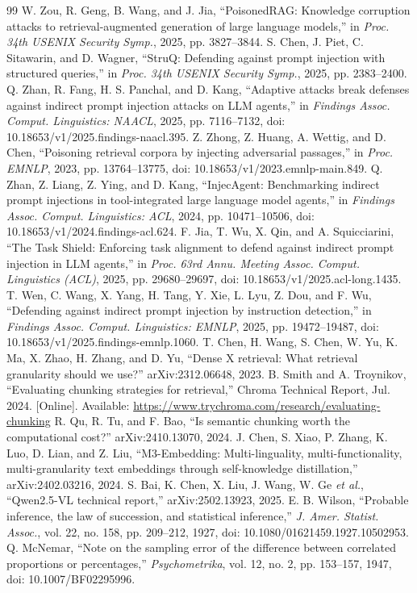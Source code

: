 \documentclass[conference]{IEEEtran}
\begin{document}
\begin{thebibliography}{99}
 W. Zou, R. Geng, B. Wang, and J. Jia, ``PoisonedRAG: Knowledge corruption attacks to retrieval-augmented generation of large language models,'' in \emph{Proc. 34th USENIX Security Symp.}, 2025, pp. 3827--3844.
 S. Chen, J. Piet, C. Sitawarin, and D. Wagner, ``StruQ: Defending against prompt injection with structured queries,'' in \emph{Proc. 34th USENIX Security Symp.}, 2025, pp. 2383--2400.
 Q. Zhan, R. Fang, H. S. Panchal, and D. Kang, ``Adaptive attacks break defenses against indirect prompt injection attacks on LLM agents,'' in \emph{Findings Assoc. Comput. Linguistics: NAACL}, 2025, pp. 7116--7132, doi: 10.18653/v1/2025.findings-naacl.395.
 Z. Zhong, Z. Huang, A. Wettig, and D. Chen, ``Poisoning retrieval corpora by injecting adversarial passages,'' in \emph{Proc. EMNLP}, 2023, pp. 13764--13775, doi: 10.18653/v1/2023.emnlp-main.849.
 Q. Zhan, Z. Liang, Z. Ying, and D. Kang, ``InjecAgent: Benchmarking indirect prompt injections in tool-integrated large language model agents,'' in \emph{Findings Assoc. Comput. Linguistics: ACL}, 2024, pp. 10471--10506, doi: 10.18653/v1/2024.findings-acl.624.
 F. Jia, T. Wu, X. Qin, and A. Squicciarini, ``The Task Shield: Enforcing task alignment to defend against indirect prompt injection in LLM agents,'' in \emph{Proc. 63rd Annu. Meeting Assoc. Comput. Linguistics (ACL)}, 2025, pp. 29680--29697, doi: 10.18653/v1/2025.acl-long.1435.
 T. Wen, C. Wang, X. Yang, H. Tang, Y. Xie, L. Lyu, Z. Dou, and F. Wu, ``Defending against indirect prompt injection by instruction detection,'' in \emph{Findings Assoc. Comput. Linguistics: EMNLP}, 2025, pp. 19472--19487, doi: 10.18653/v1/2025.findings-emnlp.1060.
 T. Chen, H. Wang, S. Chen, W. Yu, K. Ma, X. Zhao, H. Zhang, and D. Yu, ``Dense X retrieval: What retrieval granularity should we use?'' arXiv:2312.06648, 2023.
 B. Smith and A. Troynikov, ``Evaluating chunking strategies for retrieval,'' Chroma Technical Report, Jul. 2024. [Online]. Available: \url{https://www.trychroma.com/research/evaluating-chunking}
 R. Qu, R. Tu, and F. Bao, ``Is semantic chunking worth the computational cost?'' arXiv:2410.13070, 2024.
 J. Chen, S. Xiao, P. Zhang, K. Luo, D. Lian, and Z. Liu, ``M3-Embedding: Multi-linguality, multi-functionality, multi-granularity text embeddings through self-knowledge distillation,'' arXiv:2402.03216, 2024.
 S. Bai, K. Chen, X. Liu, J. Wang, W. Ge \emph{et al.}, ``Qwen2.5-VL technical report,'' arXiv:2502.13923, 2025.
 E. B. Wilson, ``Probable inference, the law of succession, and statistical inference,'' \emph{J. Amer. Statist. Assoc.}, vol. 22, no. 158, pp. 209--212, 1927, doi: 10.1080/01621459.1927.10502953.
 Q. McNemar, ``Note on the sampling error of the difference between correlated proportions or percentages,'' \emph{Psychometrika}, vol. 12, no. 2, pp. 153--157, 1947, doi: 10.1007/BF02295996.
\end{thebibliography}
\end{document}
